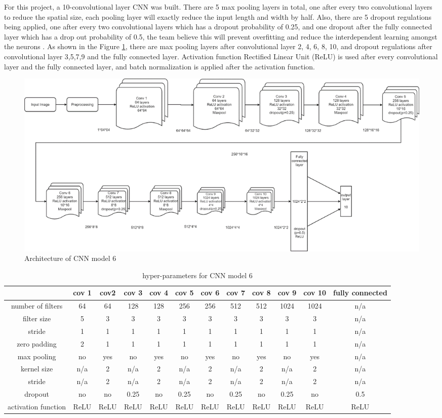 \documentclass[letterpaper, 10 pt, conference]{ieeeconf}  %
\begin{document}
For this project, a 10-convolutional layer CNN was built. There are 5 max pooling layers in total, one after every two convolutional layers to reduce the spatial size, each pooling layer will exactly reduce the input length and width by half. Also, there are 5 dropout regulations being applied, one after every two convolutional layers which has a dropout probability of 0.25, and one dropout after the fully connected layer which has a drop out probability of 0.5, the team believe this will prevent overfitting and reduce the interdependent learning amongst the neurons \cite{Budhiraja2016}. As shown in the Figure \ref{fig:CNNarch}, there are max pooling layers after convolutional layer 2, 4, 6, 8, 10, and dropout regulations after convolutional layer 3,5,7,9 and the fully connected layer. Activation function Rectified Linear Unit (ReLU) is used after every convolutional layer and the fully connected layer, and batch normalization is applied after the activation function.
\begin{figure}[t]
	\begin{center}
		\includegraphics[width=1\textwidth]{figures/CNNflowchart.png}  %
		\caption{Architecture of CNN model 6}
		\label{fig:CNNarch}
	\end{center}
\end{figure}
\begin{table}[t]
	\centering
	\caption{hyper-parameters for CNN model 6}
	\label{tab:hyperparams}
	\begin{tabular}{|c|c|c|c|c|c|c|c|c|c|c|c|}
		\hline
	&cov 1	&cov2	&cov 3	&cov 4	&cov 5	&cov 6	&cov 7&	cov 8&	cov 9	&cov 10&	fully connected\\\hline
number of filters&	64	&64	&128	&128	&256	&256	&512	&512&	1024	&1024	&n/a \\\hline
filter size&5&3	&3	&3	&3	&3	&3	&3	&3	&3	&n/a\\\hline
stride	&1	&1	&1	&1	&1	&1	&1	&1	&1	&1	&n/a\\\hline
zero padding &2	&1	&1	&1	&1	&1	&1	&1	&1	&1	&n/a\\\hline
max pooling	&no&	yes&	no&	yes&	no&	yes&	no&	yes&	no	&yes&n/a\\\hline
kernel size&	n/a&	2&	n/a&	2&	n/a&	2	&n/a	&2	&n/a&2&n/a\\\hline
stride	&n/a&2&	n/a	&2	&n/a&2	&n/a&2	&n/a&2&	n/a\\\hline
dropout	&no&	no&	0.25&	no	&0.25&	no&	0.25&no&0.25&no&0.5\\\hline
activation function &	ReLU&	ReLU&	ReLU&	ReLU&	ReLU&	ReLU&	ReLU&	ReLU	&ReLU&	ReLU&	ReLU\\\hline
\end{tabular}
\end{table}
\end{document}

